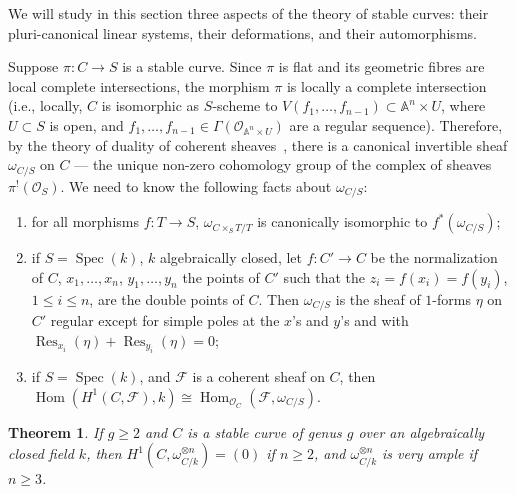 \documentclass[10pt]{amsart}
\theoremstyle{plain}
\newtheorem{theorem}{Theorem}[section]
\theoremstyle{definition}
\DeclareMathOperator{\Hom}{Hom}
\DeclareMathOperator{\Res}{Res}
\DeclareMathOperator{\Spec}{Spec}
\newcommand{\cO}{\mathcal{O}}
\begin{document}
We will study in this section three aspects of the theory of stable curves: their pluri-canonical linear systems, their deformations, and their automorphisms.

Suppose $\pi: C \to S$ is a stable curve. Since $\pi$ is flat and its geometric fibres are local complete intersections, the morphism $\pi$ is locally a complete intersection (i.e., locally, $C$ is isomorphic as $S$-scheme to $V(f_1, \ldots, f_{n-1}) \subset \mathbb{A}^n \times U$, where $U \subset S$ is open, and $f_1, \ldots, f_{n-1} \in \Gamma(\cO_{\mathbb{A}^n \times U})$ are a regular sequence). Therefore, by the theory of duality of coherent sheaves~\cite{H}, there is a canonical invertible sheaf $\omega_{C/S}$ on $C$ --- the unique non-zero cohomology group of the complex of sheaves $\pi^!(\cO_S)$. We need to know the following facts about $\omega_{C/S}$:

\begin{enumerate}
\item[a)] for all morphisms $f: T \to S$, $\omega_{C \times_S T/T}$ is canonically isomorphic to $f^*(\omega_{C/S})$;
\item[b)] if $S = \Spec(k)$, $k$ algebraically closed, let $f: C' \to C$ be the normalization of $C$, $x_1, \ldots, x_n$, $y_1, \ldots, y_n$ the points of $C'$ such that the $z_i = f(x_i) = f(y_i)$, $1 \leq i \leq n$, are the double points of $C$. Then $\omega_{C/S}$ is the sheaf of $1$-forms $\eta$ on $C'$ regular except for simple poles at the $x$'s and $y$'s and with $\Res_{x_i}(\eta) + \Res_{y_i}(\eta) = 0$;
\item[c)] if $S = \Spec(k)$, and $\mathscr{F}$ is a coherent sheaf on $C$, then $\Hom(H^1(C, \mathscr{F}), k) \cong \Hom_{\cO_C}(\mathscr{F}, \omega_{C/S})$.
\end{enumerate}

\begin{theorem}\label{thm:1.2}
If $g \geq 2$ and $C$ is a stable curve of genus $g$ over an algebraically closed field $k$, then $H^1(C, \omega_{C/k}^{\otimes n}) = (0)$ if $n \geq 2$, and $\omega_{C/k}^{\otimes n}$ is very ample if $n \geq 3$.
\end{theorem}
\end{document}
